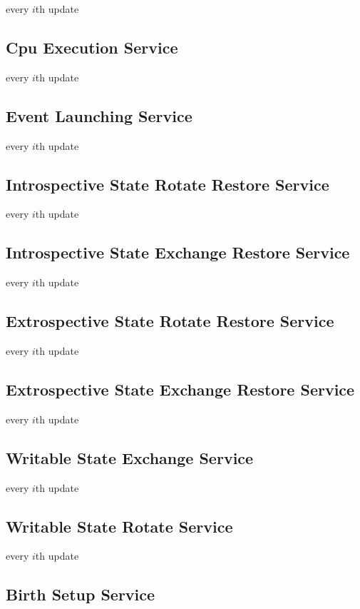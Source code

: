 every $i$th update

\subsection{Cpu Execution Service}

every $i$th update

\subsection{Event Launching Service}

every $i$th update

\subsection{Introspective State Rotate Restore Service}

every $i$th update

\subsection{Introspective State Exchange Restore Service}

every $i$th update

\subsection{Extrospective State Rotate Restore Service}

every $i$th update

\subsection{Extrospective State Exchange Restore Service}

every $i$th update

\subsection{Writable State Exchange Service}

every $i$th update

\subsection{Writable State Rotate Service}

every $i$th update

\subsection{Birth Setup Service}

